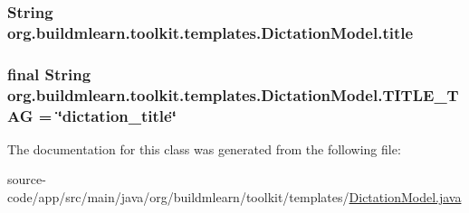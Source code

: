 \subsubsection[{\texorpdfstring{title}{title}}]{\setlength{\rightskip}{0pt plus 5cm}String org.\+buildmlearn.\+toolkit.\+templates.\+Dictation\+Model.\+title\hspace{0.3cm}{\ttfamily [private]}}\hypertarget{classorg_1_1buildmlearn_1_1toolkit_1_1templates_1_1DictationModel_a4d4accc8a072d6f95c93fb2e9a5d7797}{}\label{classorg_1_1buildmlearn_1_1toolkit_1_1templates_1_1DictationModel_a4d4accc8a072d6f95c93fb2e9a5d7797}
\subsubsection[{\texorpdfstring{T\+I\+T\+L\+E\+\_\+\+T\+AG}{TITLE_TAG}}]{\setlength{\rightskip}{0pt plus 5cm}final String org.\+buildmlearn.\+toolkit.\+templates.\+Dictation\+Model.\+T\+I\+T\+L\+E\+\_\+\+T\+AG = \char`\"{}dictation\+\_\+title\char`\"{}\hspace{0.3cm}{\ttfamily [static]}}\hypertarget{classorg_1_1buildmlearn_1_1toolkit_1_1templates_1_1DictationModel_aff457132695ced3adfbf905ae80e4003}{}\label{classorg_1_1buildmlearn_1_1toolkit_1_1templates_1_1DictationModel_aff457132695ced3adfbf905ae80e4003}


The documentation for this class was generated from the following file\+:\begin{DoxyCompactItemize}
\item 
source-\/code/app/src/main/java/org/buildmlearn/toolkit/templates/\hyperlink{DictationModel_8java}{Dictation\+Model.\+java}\end{DoxyCompactItemize}
